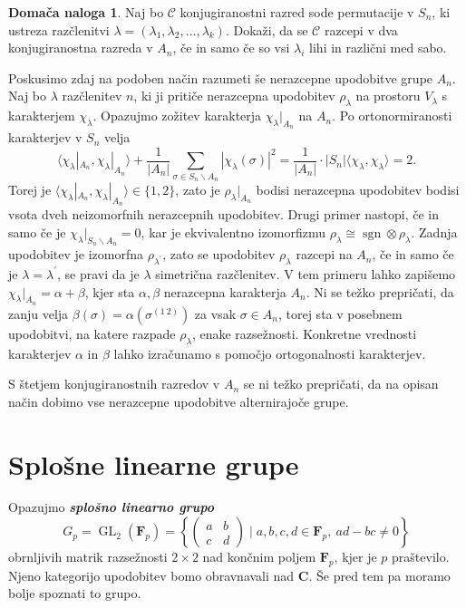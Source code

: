 \documentclass[11pt]{book}
\def\CC{\mathbf{C}}
\def\conclass{\mathcal{C}}
\def\FF{\mathbf{F}}
\DeclareMathOperator\sgn{sgn}
\DeclareMathOperator\GL{GL}
\def\definicija{\color{rdeca}\bf\em}
\theoremstyle{definition}
\theoremstyle{zgled}
\theoremstyle{odprtproblem}
\theoremstyle{domacanaloga}
\newtheorem*{domacanaloga}{Domača naloga}
\theoremstyle{izrek}
\begin{document}
\begin{domacanaloga}
Naj bo $\conclass$ konjugiranostni razred sode permutacije v $S_n$, ki ustreza razčlenitvi $\lambda = (\lambda_1, \lambda_2, \dots, \lambda_k)$. Dokaži, da se $\conclass$ razcepi v dva konjugiranostna razreda v $A_n$, če in samo če so vsi $\lambda_i$ lihi in različni med sabo.
\end{domacanaloga}

Poskusimo zdaj na podoben način razumeti še nerazcepne upodobitve grupe $A_n$. Naj bo $\lambda$ razčlenitev $n$, ki ji pritiče nerazcepna upodobitev $\rho_{\lambda}$ na prostoru $V_{\lambda}$ s karakterjem $\chi_{\lambda}$. Opazujmo zožitev karakterja $\chi_{\lambda}|_{A_n}$ na $A_n$. Po ortonormiranosti karakterjev v $S_n$ velja
\[
    \langle \chi_{\lambda}|_{A_n}, \chi_{\lambda}|_{A_n} \rangle
    +
    \frac{1}{|A_n|} \sum_{\sigma \in S_n \backslash A_n} |\chi_{\lambda}(\sigma)|^2
    =
    \frac{1}{|A_n|} \cdot |S_n| \langle \chi_{\lambda}, \chi_{\lambda} \rangle
    = 2.
\]
Torej je $\langle \chi_{\lambda}|_{A_n}, \chi_{\lambda}|_{A_n} \rangle \in \{ 1, 2 \}$, zato je $\rho_{\lambda}|_{A_n}$ bodisi nerazcepna upodobitev bodisi vsota dveh neizomorfnih nerazcepnih upodobitev. Drugi primer nastopi, če in samo če je $\chi_{\lambda}|_{S_n \backslash A_n} = 0$, kar je ekvivalentno izomorfizmu $\rho_{\lambda} \cong \sgn \otimes \rho_{\lambda}$. Zadnja upodobitev je izomorfna $\rho_{\lambda^\prime}$, zato se upodobitev $\rho_{\lambda}$ razcepi na $A_n$, če in samo če je $\lambda = \lambda^\prime$, se pravi da je $\lambda$ simetrična razčlenitev. V tem primeru lahko zapišemo $\chi_{\lambda}|_{A_n} = \alpha + \beta$, kjer sta $\alpha, \beta$ nerazcepna karakterja $A_n$. Ni se težko prepričati, da zanju velja $\beta(\sigma) = \alpha(\sigma^{(1 \ 2)})$ za vsak $\sigma \in A_n$, torej sta v posebnem upodobitvi, na katere razpade $\rho_{\lambda}$, enake razsežnosti. Konkretne vrednosti karakterjev $\alpha$ in $\beta$ lahko izračunamo s pomočjo ortogonalnosti karakterjev. 

S štetjem konjugiranostnih razredov v $A_n$ se ni težko prepričati, da na opisan način dobimo vse nerazcepne upodobitve alternirajoče grupe.


\section{Splošne linearne grupe}

Opazujmo {\definicija splošno linearno grupo}
\[
    G_p = {\textstyle \GL_2(\FF_p)} =
    \left\{ \begin{pmatrix} a & b \\ c & d \end{pmatrix} \mid a,b,c,d \in \FF_p, \ ad - bc \neq 0 \right\}
\] 
obrnljivih matrik razsežnosti $2 \times 2$ nad končnim poljem $\FF_p$, kjer je $p$ praštevilo. Njeno kategorijo upodobitev bomo obravnavali nad $\CC$. Še pred tem pa moramo bolje spoznati to grupo.
\end{document}
